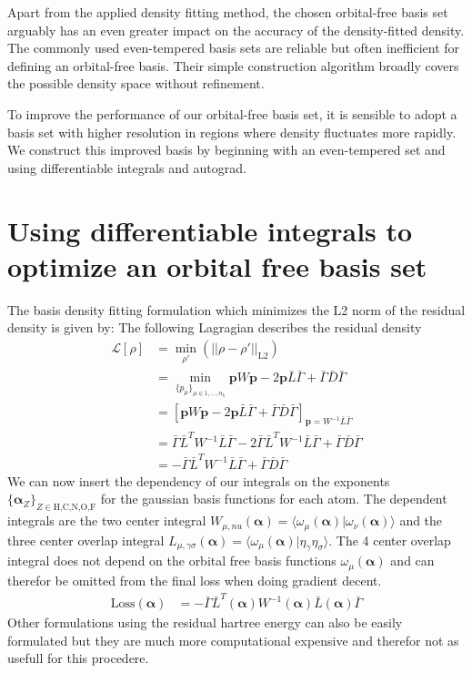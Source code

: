 Apart from the applied density fitting method, the chosen orbital-free basis set arguably has an even greater impact on the accuracy of the density-fitted density. The commonly used even-tempered basis sets are reliable but often inefficient for defining an orbital-free basis. Their simple construction algorithm \cite{const} broadly covers the possible density space without refinement.

To improve the performance of our orbital-free basis set, it is sensible to adopt a basis set with higher resolution in regions where density fluctuates more rapidly. We construct this improved basis by beginning with an even-tempered set and using differentiable integrals and autograd.

\section{Using differentiable integrals to optimize an orbital free basis set}
The basis density fitting formulation which minimizes the L2 norm of the residual density is given by:
The following Lagragian describes the residual density
\begin{align}
    \mathcal{L}[\rho] &= \min_{\rho'}\left(||\rho-\rho'||_{\text{L2}}\right)\\
    & = \min_{\{p_{\mu}\}_{\mu \in 1,...,n_b}} \mathbf{p}W \mathbf{p} - 2 \mathbf{p} \bar L \bar\Gamma + \bar\Gamma \bar D \bar\Gamma\\
    & = \left[\mathbf{p} W \mathbf{p} - 2 \mathbf{p} \bar L \bar\Gamma+ \bar\Gamma \bar D \bar\Gamma\right]_{\mathbf{p} = W^{-1}\bar{L}\bar\Gamma}\\
    & = \bar \Gamma \bar L ^T W^{-1} \bar L \bar \Gamma - 2 \bar \Gamma \bar L^T W^{-1} \bar L \bar \Gamma + \bar \Gamma \bar D \bar \Gamma\\
    & = - \bar \Gamma \bar L^T W^{-1} \bar L \bar \Gamma + \bar \Gamma \bar D \bar \Gamma
\end{align}
We can now insert the dependency of our integrals on the exponents $\{\mathbf{\alpha}_Z\}_{Z\in \text{H,C,N,O,F}}$ for the gaussian basis functions for each atom.
The dependent integrals are the two center integral $W_{\mu,nu}(\mathbf{\alpha}) = \langle \omega_\mu(\mathbf{\alpha})|\omega_\nu(\mathbf{\alpha})\rangle$
 and the three center overlap integral $L_{\mu,\gamma\sigma}(\mathbf{\alpha}) = \langle \omega_\mu(\mathbf{\alpha})|\eta_\gamma\eta_\sigma\rangle$. The 4 center overlap integral does not depend on the orbital free basis functions $\omega_\mu(\mathbf{\alpha})$ and can therefor be omitted from the final loss when doing gradient decent.
 \begin{align}\label{loss_basis_set_fitting}
    \text{Loss}(\mathbf{\alpha}) & = - \bar \Gamma \bar L^T(\mathbf{\alpha}) W^{-1}(\mathbf{\alpha}) \bar L(\mathbf{\alpha}) \bar \Gamma
 \end{align}
 Other formulations using the residual hartree energy can also be easily formulated but they are much more computational expensive and therefor not as usefull for this procedere.
